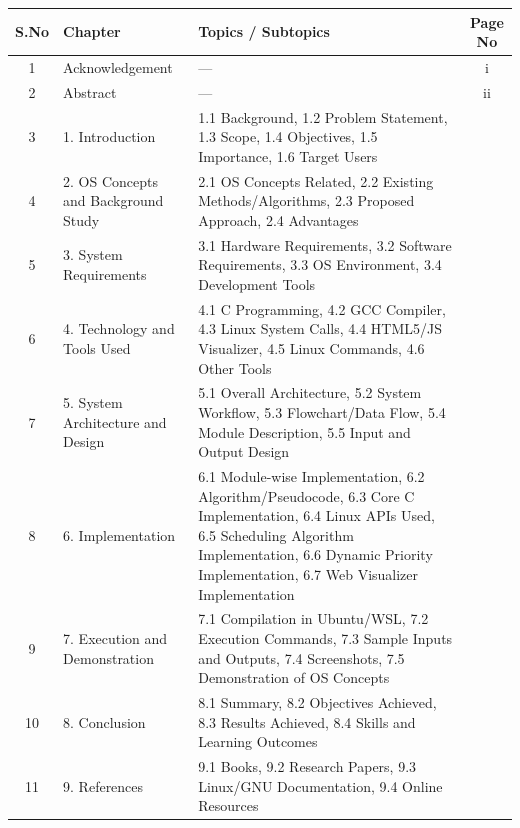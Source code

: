 \documentclass[12pt,a4paper]{report}
\begin{document}
\vspace{0.4cm}

\begin{longtable}{|c|p{4.2cm}|p{6.8cm}|c|}
\hline
\rowcolor{codebg}
\textbf{S.No} & \textbf{Chapter} & \textbf{Topics / Subtopics} & \textbf{Page No} \\
\hline
\endhead

1 & Acknowledgement & --- & i \\
\hline
2 & Abstract & --- & ii \\
\hline
3 & 1. Introduction & 1.1 Background, 1.2 Problem Statement, 1.3 Scope, 1.4 Objectives, 1.5 Importance, 1.6 Target Users & \pageref{ch1} \\
\hline
4 & 2. OS Concepts and Background Study & 2.1 OS Concepts Related, 2.2 Existing Methods/Algorithms, 2.3 Proposed Approach, 2.4 Advantages & \pageref{ch2} \\
\hline
5 & 3. System Requirements & 3.1 Hardware Requirements, 3.2 Software Requirements, 3.3 OS Environment, 3.4 Development Tools & \pageref{ch3} \\
\hline
6 & 4. Technology and Tools Used & 4.1 C Programming, 4.2 GCC Compiler, 4.3 Linux System Calls, 4.4 HTML5/JS Visualizer, 4.5 Linux Commands, 4.6 Other Tools & \pageref{ch4} \\
\hline
7 & 5. System Architecture and Design & 5.1 Overall Architecture, 5.2 System Workflow, 5.3 Flowchart/Data Flow, 5.4 Module Description, 5.5 Input and Output Design & \pageref{ch5} \\
\hline
8 & 6. Implementation & 6.1 Module-wise Implementation, 6.2 Algorithm/Pseudocode, 6.3 Core C Implementation, 6.4 Linux APIs Used, 6.5 Scheduling Algorithm Implementation, 6.6 Dynamic Priority Implementation, 6.7 Web Visualizer Implementation & \pageref{ch6} \\
\hline
9 & 7. Execution and Demonstration & 7.1 Compilation in Ubuntu/WSL, 7.2 Execution Commands, 7.3 Sample Inputs and Outputs, 7.4 Screenshots, 7.5 Demonstration of OS Concepts & \pageref{ch7} \\
\hline
10 & 8. Conclusion & 8.1 Summary, 8.2 Objectives Achieved, 8.3 Results Achieved, 8.4 Skills and Learning Outcomes & \pageref{ch8} \\
\hline
11 & 9. References & 9.1 Books, 9.2 Research Papers, 9.3 Linux/GNU Documentation, 9.4 Online Resources & \pageref{ch9} \\
\hline
\end{longtable}

\newpage
{}
\setcounter{page}{1}
\end{document}
